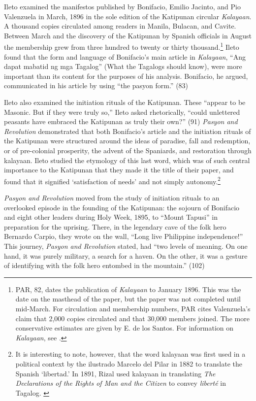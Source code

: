 Ileto examined the manifestos published by Bonifacio, Emilio Jacinto, and Pio Valenzuela in March, 1896 in the sole edition of the Katipunan circular \textit{Kalayaan}. A thousand copies circulated among readers in Manila, Bulacan, and Cavite. Between March and the discovery of the Katipunan by Spanish officials in August the membership grew from three hundred to twenty or thirty thousand.\footnote{PAR, 82, dates the publication of \textit{Kalayaan} to January 1896. This was the date on the masthead of the paper, but the paper was not completed until mid-March. For circulation and membership numbers, PAR cites Valenzuela's claim that 2,000 copies circulated and that 30,000 members joined. The more conservative estimates are given by E. de los Santos. For information on \textit{Kalayaan}, see \cite{Richardson2005}.}  Ileto found that the form and language of Bonifacio's main article in \textit{Kalayaan}, \enquote{Ang dapat mabatid ng mga Tagalog} (What the Tagalogs should know), were more important than its content for the purposes of his analysis. Bonifacio, he argued, communicated in his article by using \enquote{the pasyon form.} (83) 

Ileto also examined the initiation rituals of the Katipunan. These \enquote{appear to be Masonic. But if they were truly so,} Ileto asked rhetorically, \enquote{could unlettered peasants have embraced the Katipunan as truly their own?} (91) \textit{Pasyon and Revolution} demonstrated that both Bonifacio's article and the initiation rituals of the Katipunan were structured around the ideas of paradise, fall and redemption, or of pre-colonial prosperity, the advent of the Spaniards, and restoration through kalayaan. Ileto studied the etymology of this last word, which was of such central importance to the Katipunan that they made it the title of their paper, and found that it signified \enquote*{satisfaction of needs} and not simply autonomy.\footnote{It is interesting to note, however, that the word kalayaan was first used in a political context by the ilustrado Marcelo del Pilar in 1882 to translate the Spanish \enquote*{libertad.} In 1891, Rizal used kalayaan in translating \textit{The Declarations of the Rights of Man and the Citizen} to convey \textit{libert\'e} in Tagalog. \cite{Richardson2005}}

\textit{Pasyon and Revolution} moved from the study of initiation rituals to an overlooked episode in the founding of the Katipunan: the sojourn of Bonifacio and eight other leaders during Holy Week, 1895, to \enquote{Mount Tapusi} in preparation for the uprising. There, in the legendary cave of the folk hero Bernardo Carpio, they wrote on the wall, \enquote{Long live Philippine independence!} This journey, \textit{Pasyon and Revolution} stated, had \enquote{two levels of meaning. On one hand, it was purely military, a search for a haven. On the other, it was a gesture of identifying with the folk hero entombed in the mountain.} (102)
 
